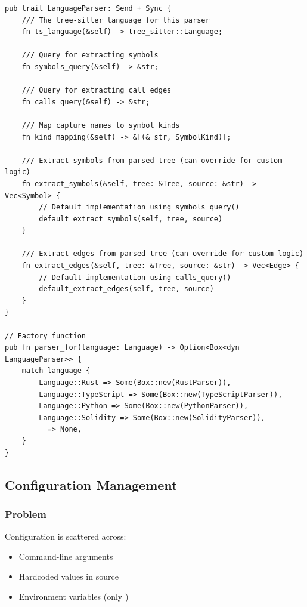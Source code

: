 \begin{lstlisting}[style=rustcode, caption={LanguageParser trait}]
pub trait LanguageParser: Send + Sync {
    /// The tree-sitter language for this parser
    fn ts_language(&self) -> tree_sitter::Language;
    
    /// Query for extracting symbols
    fn symbols_query(&self) -> &str;
    
    /// Query for extracting call edges
    fn calls_query(&self) -> &str;
    
    /// Map capture names to symbol kinds
    fn kind_mapping(&self) -> &[(& str, SymbolKind)];
    
    /// Extract symbols from parsed tree (can override for custom logic)
    fn extract_symbols(&self, tree: &Tree, source: &str) -> Vec<Symbol> {
        // Default implementation using symbols_query()
        default_extract_symbols(self, tree, source)
    }
    
    /// Extract edges from parsed tree (can override for custom logic)
    fn extract_edges(&self, tree: &Tree, source: &str) -> Vec<Edge> {
        // Default implementation using calls_query()
        default_extract_edges(self, tree, source)
    }
}

// Factory function
pub fn parser_for(language: Language) -> Option<Box<dyn LanguageParser>> {
    match language {
        Language::Rust => Some(Box::new(RustParser)),
        Language::TypeScript => Some(Box::new(TypeScriptParser)),
        Language::Python => Some(Box::new(PythonParser)),
        Language::Solidity => Some(Box::new(SolidityParser)),
        _ => None,
    }
}
\end{lstlisting}

\subsection{Configuration Management}

\subsubsection{Problem}

Configuration is scattered across:
\begin{itemize}
    \item Command-line arguments
    \item Hardcoded values in source
    \item Environment variables (only )
\end{itemize}

